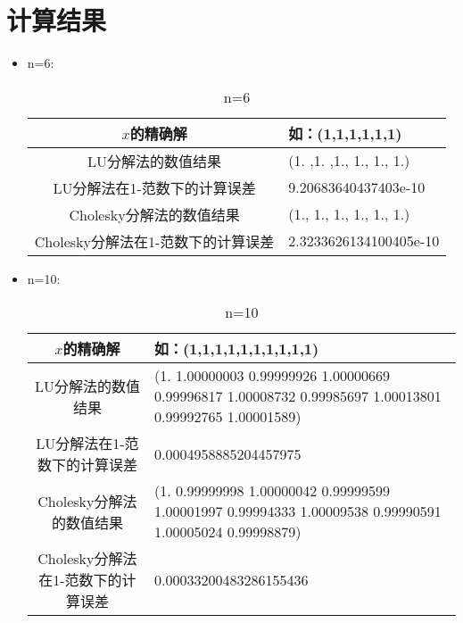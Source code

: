 \documentclass[12pt]{article}
\begin{document}
\section{计算结果}
\begin{itemize}
  \item n=6:
\begin{table} [htb]
\begin{center}
\begin{tabularx}{\textwidth}{|c|X|}%
\hline
\color{blue}$x$的精确解 & \color{blue} 如：(1,1,1,1,1,1) \\
\hline
\color{blue}LU分解法的数值结果      &\color{blue}(1. ,1. ,1., 1., 1., 1.) \\
\hline
\color{blue}LU分解法在1-范数下的计算误差     &\color{blue}9.20683640437403e-10  \\
\hline
\color{blue}Cholesky分解法的数值结果      &\color{blue}(1., 1., 1., 1., 1., 1.) \\
\hline
\color{blue}Cholesky分解法在1-范数下的计算误差      &\color{blue}2.3233626134100405e-10  \\
\hline
\end{tabularx}
\end{center}
\caption{n=6}
\end{table}

\item n=10:
\begin{table} [H]
\begin{center}
  \begin{tabularx}{\textwidth}{|c|X|} %
\hline
\color{blue}$x$的精确解 & \color{blue} 如：(1,1,1,1,1,1,1,1,1,1) \\
\hline
\color{blue}LU分解法的数值结果      &\color{blue}(1.         1.00000003 0.99999926 1.00000669 0.99996817 1.00008732
0.99985697 1.00013801 0.99992765 1.00001589) \\
\hline
\color{blue}LU分解法在1-范数下的计算误差     &\color{blue}0.0004958885204457975  \\
\hline
\color{blue}Cholesky分解法的数值结果      &\color{blue}(1.         0.99999998 1.00000042 0.99999599 1.00001997 0.99994333
1.00009538 0.99990591 1.00005024 0.99998879)  \\
\hline
\color{blue}Cholesky分解法在1-范数下的计算误差      &\color{blue}0.00033200483286155436  \\
\hline
\end{tabularx}
\end{center}
\caption{n=10}
\end{table}


\end{itemize}
\end{document}
